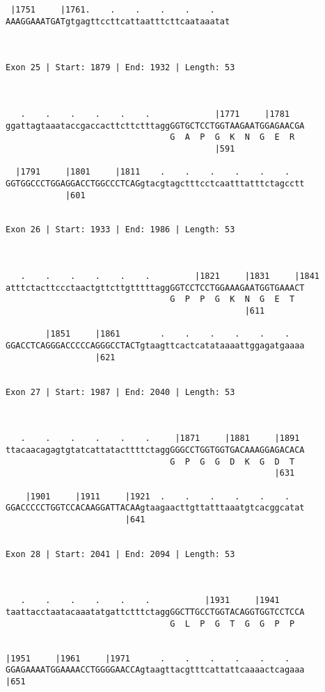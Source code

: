 \documentclass{article}
\begin{document}
\begin{Verbatim}
 |1751     |1761.    .    .    .    .    .   
AAAGGAAATGATgtgagttccttcattaatttcttcaataaatat
                                             
  
 
Exon 25 | Start: 1879 | End: 1932 | Length: 53



   .    .    .    .    .    .             |1771     |1781   
ggattagtaaataccgaccacttcttctttaggGGTGCTCCTGGTAAGAATGGAGAACGA
                                 G  A  P  G  K  N  G  E  R  
                                          |591              
  
  |1791     |1801     |1811    .    .    .    .    .    .   
GGTGGCCCTGGAGGACCTGGCCCTCAGgtacgtagctttcctcaatttatttctagcctt
            |601                                            
  
 
Exon 26 | Start: 1933 | End: 1986 | Length: 53



   .    .    .    .    .    .         |1821     |1831     |1841
atttctacttccctaactgttcttgtttttaggGGTCCTCCTGGAAAGAATGGTGAAACT
                                 G  P  P  G  K  N  G  E  T  
                                                |611        
  
        |1851     |1861        .    .    .    .    .    .   
GGACCTCAGGGACCCCCAGGGCCTACTgtaagttcactcatataaaattggagatgaaaa
                  |621                                      
  
 
Exon 27 | Start: 1987 | End: 2040 | Length: 53



   .    .    .    .    .    .     |1871     |1881     |1891 
ttacaacagagtgtatcattatacttttctaggGGGCCTGGTGGTGACAAAGGAGACACA
                                 G  P  G  G  D  K  G  D  T  
                                                      |631  
  
    |1901     |1911     |1921  .    .    .    .    .    .   
GGACCCCCTGGTCCACAAGGATTACAAgtaagaacttgttatttaaatgtcacggcatat
                        |641                                
  
 
Exon 28 | Start: 2041 | End: 2094 | Length: 53



   .    .    .    .    .    .           |1931     |1941     
taattacctaatacaaatatgattctttctaggGGCTTGCCTGGTACAGGTGGTCCTCCA
                                 G  L  P  G  T  G  G  P  P  
                                                            
  
|1951     |1961     |1971      .    .    .    .    .    .   
GGAGAAAATGGAAAACCTGGGGAACCAgtaagttacgtttcattattcaaaactcagaaa
|651                                                        
  

\end{Verbatim}
\end{document}
